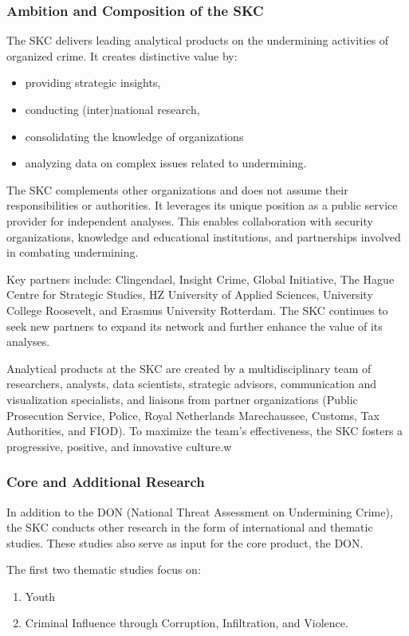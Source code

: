 \subsubsection{Ambition and Composition of the SKC}
The SKC delivers leading analytical products on the undermining activities of organized crime. It creates distinctive value by:
\begin{itemize}
	\item providing strategic insights,
	\item conducting (inter)national research,
	\item consolidating the knowledge of organizations
	\item analyzing data on complex issues related to undermining.
\end{itemize}

The SKC complements other organizations and does not assume their responsibilities or authorities. It leverages its unique position as a public service provider for independent analyses. This enables collaboration with security organizations, knowledge and educational institutions, and partnerships involved in combating undermining. 

Key partners include: Clingendael, Insight Crime, Global Initiative, The Hague Centre for Strategic Studies, HZ University of Applied Sciences, University College Roosevelt, and Erasmus University Rotterdam. The SKC continues to seek new partners to expand its network and further enhance the value of its analyses.

Analytical products at the SKC are created by a multidisciplinary team of researchers, analysts, data scientists, strategic advisors, communication and visualization specialists, and liaisons from partner organizations (Public Prosecution Service, Police, Royal Netherlands Marechaussee, Customs, Tax Authorities, and FIOD). To maximize the team’s effectiveness, the SKC fosters a progressive, positive, and innovative culture.w

\subsubsection{Core and Additional Research}
In addition to the DON (National Threat Assessment on Undermining Crime), the SKC conducts other research in the form of international and thematic studies. These studies also serve as input for the core product, the DON.

The first two thematic studies focus on:
\begin{enumerate}
	\item Youth
	\item Criminal Influence through Corruption, Infiltration, and Violence.
\end{enumerate}

